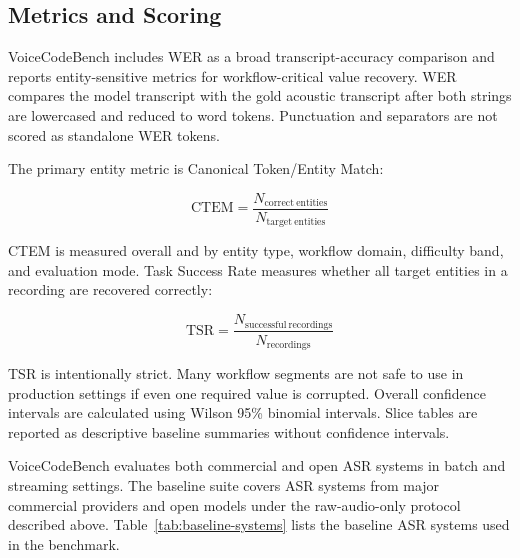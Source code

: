 \documentclass[10pt,twocolumn]{article}
\begin{document}
\subsection{Metrics and Scoring}\label{metrics}\label{statistical-reporting}\label{baseline-systems}

VoiceCodeBench includes WER as a broad transcript-accuracy comparison
and reports entity-sensitive metrics for workflow-critical value
recovery. WER compares the model transcript with the gold acoustic
transcript after both strings are lowercased and reduced to word tokens.
Punctuation and separators are not scored as standalone WER tokens.

The primary entity metric is Canonical Token/Entity Match:

\[
	\mathrm{CTEM} =
	\frac{N_{\mathrm{correct\ entities}}}{N_{\mathrm{target\ entities}}}
\]

CTEM is measured overall and by entity type, workflow domain, difficulty
band, and evaluation mode. Task Success Rate measures whether all target
entities in a recording are recovered correctly:

\[
	\mathrm{TSR} =
	\frac{N_{\mathrm{successful\ recordings}}}{N_{\mathrm{recordings}}}
\]

TSR is intentionally strict. Many workflow segments are not safe to use
in production settings if even one required value is corrupted. Overall
confidence intervals are calculated using Wilson 95\% binomial intervals.
Slice tables are reported as descriptive baseline summaries without
confidence intervals.

VoiceCodeBench evaluates both commercial and open ASR systems in batch
and streaming settings. The baseline suite covers ASR systems from
major commercial providers and open models under the raw-audio-only
protocol described above. Table~\ref{tab:baseline-systems} lists the
baseline ASR systems used in the benchmark.
\end{document}
